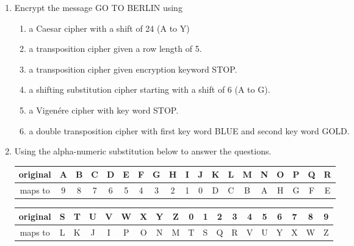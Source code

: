 \documentclass[12pt]{article}
\begin{document}
\begin{enumerate}
\item Encrypt the message GO TO BERLIN using
	\begin{enumerate}
	\item a Caesar cipher with a shift of 24 (A to Y)
	\vfill
	\item a transposition cipher given a row length of 5.
	\vfill
	\item a transposition cipher given encryption keyword STOP.
	\vfill
	\item a shifting substitution cipher starting with a shift of 6 (A to G).
	\vfill
	\item a Vigen\'{e}re cipher with key word STOP.
	\vfill
	\item a double transposition cipher with first key word BLUE and second key word GOLD.
	\vfill
	\end{enumerate}
\item Using the alpha-numeric substitution below to answer the questions.

{\scriptsize
\begin{tabular}{|c|c|c|c|c|c|c|c|c|c|c|c|c|c|c|c|c|c|c|}
\hline
original& A&B&C&D&E&F&G&H&I&J&K&L&M&N&O&P&Q&R\\  \hline
maps to&9&8&7&6&5&4&3&2&1&0&D&C&B&A&H&G&F&E\\
\hline
\end{tabular}

\begin{tabular}{|c|c|c|c|c|c|c|c|c|c|c|c|c|c|c|c|c|c|c|}
 \hline
original &S&T&U&V&W&X&Y&Z&0&1&2&3&4&5&6&7&8&9\\ \hline
maps to&L&K&J&I&P&O&N&M&T&S&Q&R&V&U&Y&X&W&Z \\
\hline
\end{tabular}
}


\end{enumerate}
\end{document}
